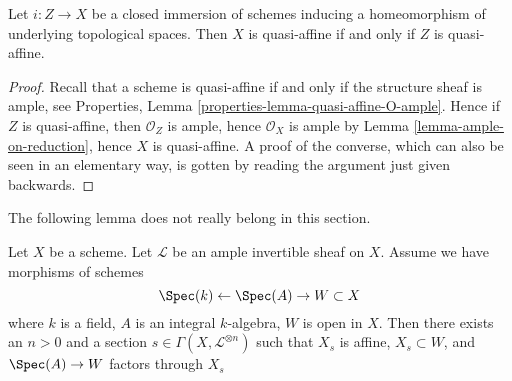 \begin{lemma}
\label{lemma-thickening-quasi-affine}
Let $i : Z \to X$ be a closed immersion of schemes
inducing a homeomorphism of underlying topological spaces.
Then $X$ is quasi-affine if and only if $Z$ is quasi-affine.
\end{lemma}

\begin{proof}
Recall that a scheme is quasi-affine
if and only if the structure sheaf is ample, see
Properties, Lemma \ref{properties-lemma-quasi-affine-O-ample}.
Hence if $Z$ is quasi-affine, then $\mathcal{O}_Z$ is ample,
hence $\mathcal{O}_X$ is ample by
Lemma \ref{lemma-ample-on-reduction}, hence
$X$ is quasi-affine. A proof of the converse, which
can also be seen in an elementary way, is gotten by
reading the argument just given backwards.
\end{proof}

\noindent
The following lemma does not really belong in this section.

\begin{lemma}
\label{lemma-ample-profinite-set-in-principal-affine}
Let $X$ be a scheme. Let $\mathcal{L}$ be an ample invertible sheaf on $X$.
Assume we have morphisms of schemes
$$
\Spec(k) \leftarrow \Spec(A) \to W \subset X
$$
where $k$ is a field, $A$ is an integral $k$-algebra, $W$ is open in $X$.
Then there exists an $n > 0$ and a section
$s \in \Gamma(X, \mathcal{L}^{\otimes n})$ such that
$X_s$ is affine, $X_s \subset W$, and $\Spec(A) \to W$ factors through $X_s$
\end{lemma}

